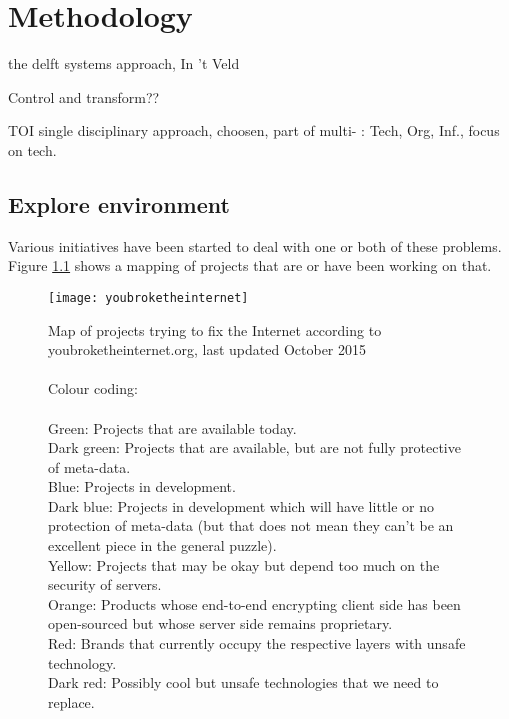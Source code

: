 \chapter{Methodology}

the delft systems approach, In 't Veld

Control and transform??


TOI single disciplinary approach, choosen, part of multi- : Tech, Org, Inf., focus on tech.


\section{Explore environment}

Various initiatives have been started to deal with one or both of these problems.
Figure \ref{fig:youbroketheinternet} shows a mapping of projects that are or have been working on that.
\\
\begin{figure}[h]
	\centering
	\texttt{[image: youbroketheinternet]}
	\caption{Map of projects trying to fix the Internet according to youbroketheinternet.org, last updated October 2015\\
		\\
		Colour coding:\\
		\\
		\textcolor[RGB]{51,204,51}{Green:} Projects that are available today.\\
		\textcolor[RGB]{86,149,38}{Dark green:} Projects that are available, but are not fully protective of meta-data.\\
		\textcolor[RGB]{89,204,255}{Blue:} Projects in development.\\
		\textcolor[RGB]{17,153,211}{Dark blue:} Projects in development which will have little or no protection of meta-data (but that does not mean they can't be an excellent piece in the general puzzle).\\
		\textcolor[RGB]{226,228,27}{Yellow:} Projects that may be okay but depend too much on the security of servers.\\
		\textcolor[RGB]{255,153,51}{Orange:} Products whose end-to-end encrypting client side has been open-sourced but whose server side remains proprietary.\\
		\textcolor[RGB]{225,77,93}{Red:} Brands that currently occupy the respective layers with unsafe technology.\\
		\textcolor[RGB]{155,35,25}{Dark red:} Possibly cool but unsafe technologies that we need to replace.}
	\label{fig:youbroketheinternet}
\end{figure}


